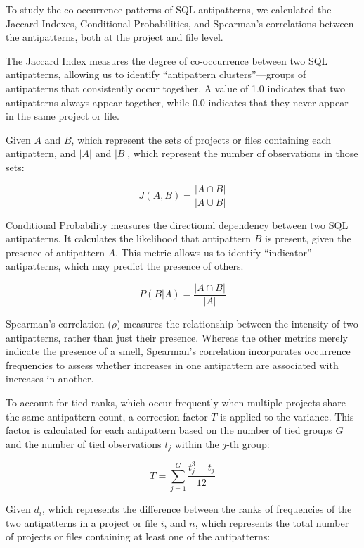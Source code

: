 To study the co-occurrence patterns of SQL antipatterns, we calculated the Jaccard Indexes, Conditional Probabilities, and Spearman's correlations between the antipatterns, both at the project and file level. 

The Jaccard Index measures the degree of co-occurrence between two SQL antipatterns, allowing us to identify “antipattern clusters”—groups of antipatterns that consistently occur together. A value of \num{1.0} indicates that two antipatterns always appear together, while \num{0.0} indicates that they never appear in the same project or file.

Given \(A\) and \(B\), which represent the sets of projects or files containing each antipattern, and \(|A|\) and \(|B|\), which represent the number of observations in those sets:

\begin{equation}
J(A, B) = \frac{|A \cap B|}{|A \cup B|}
\end{equation}

Conditional Probability measures the directional dependency between two SQL antipatterns. It calculates the likelihood that antipattern \(B\) is present, given the presence of antipattern \(A\). This metric allows us to identify “indicator” antipatterns, which may predict the presence of others.

\begin{equation}
P(B | A) = \frac{|A \cap B|}{|A|}
\end{equation}

Spearman’s correlation (\(\rho\)) measures the relationship between the intensity of two antipatterns, rather than just their presence. Whereas the other metrics merely indicate the presence of a smell, Spearman’s correlation incorporates occurrence frequencies to assess whether increases in one antipattern are associated with increases in another.

To account for tied ranks, which occur frequently when multiple projects share the same antipattern count, a correction factor \(T\) is applied to the variance. This factor is calculated for each antipattern based on the number of tied groups \(G\) and the number of tied observations \(t_j\) within the \(j\)-th group:

\begin{equation}
T = \sum_{j=1}^{G} \frac{t_j^3 - t_j}{12}
\end{equation}

Given \(d_i\), which represents the difference between the ranks of frequencies of the two antipatterns in a project or file \(i\), and \(n\), which represents the total number of projects or files containing at least one of the antipatterns:

